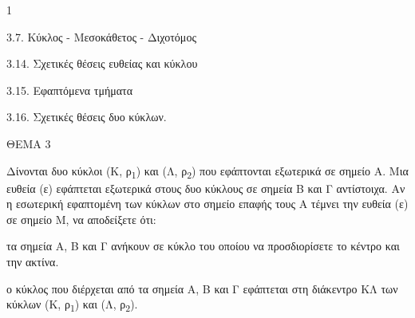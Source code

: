 \begin{ylh}{1}
    \item 3.7. Κύκλος - Μεσοκάθετος - Διχοτόμος
    \item 3.14. Σχετικές θέσεις ευθείας και κύκλου
    \item 3.15. Εφαπτόμενα τμήματα
    \item 3.16. Σχετικές θέσεις δυο κύκλων.
\end{ylh}

ΘΕΜΑ 3

Δίνονται δυο κύκλοι (Κ, ρ\textsubscript{1}) και (Λ, ρ\textsubscript{2}) που εφάπτονται εξωτερικά σε σημείο Α. Μια ευθεία (ε) εφάπτεται εξωτερικά στους δυο κύκλους σε σημεία Β και Γ αντίστοιχα. Αν η εσωτερική εφαπτομένη των κύκλων στο σημείο επαφής τους Α τέμνει την ευθεία (ε) σε σημείο Μ, να αποδείξετε ότι:

\begin{alist}
\item τα σημεία Α, Β και Γ ανήκουν σε κύκλο του οποίου να προσδιορίσετε το κέντρο και την ακτίνα. 

\item ο κύκλος που διέρχεται από τα σημεία Α, Β και Γ εφάπτεται στη διάκεντρο ΚΛ των κύκλων (Κ, ρ\textsubscript{1}) και (Λ, ρ\textsubscript{2}). 
\end{alist}
